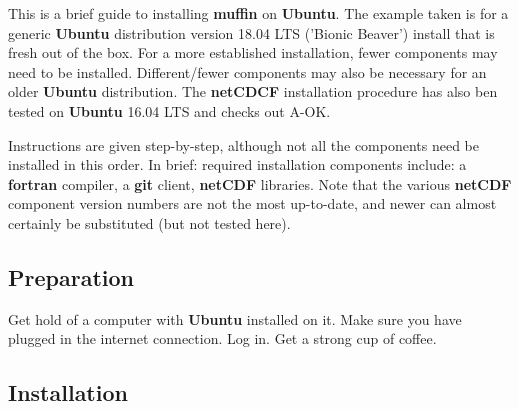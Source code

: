 \documentclass[11pt,fleqn]{book} %
\begin{document}

This is a brief guide to installing \textbf{muffin} on \textbf{Ubuntu}. The example taken is for a generic \textbf{Ubuntu} distribution version 18.04 LTS ('Bionic Beaver') install that is fresh out of the box. For a more established installation, fewer components may need to be installed. Different/fewer components may also be necessary for an older \textbf{Ubuntu} distribution.
The \textbf{netCDCF} installation procedure has also ben tested on \textbf{Ubuntu} 16.04 LTS and checks out A-OK.

Instructions are given step-by-step, although not all the components need be installed in this order. In brief: required installation components include: a \textbf{fortran} compiler, a \textbf{git} client, \textbf{netCDF} libraries.
Note that the various \textbf{netCDF} component version numbers are not the most up-to-date, and newer can almost certainly be substituted (but not tested here).
%
\subsection*{Preparation}

Get hold of a computer with \textbf{Ubuntu} installed on it. Make sure you have plugged in the internet connection. Log in. Get a strong cup of coffee.

%
\subsection*{Installation}
\end{document}
